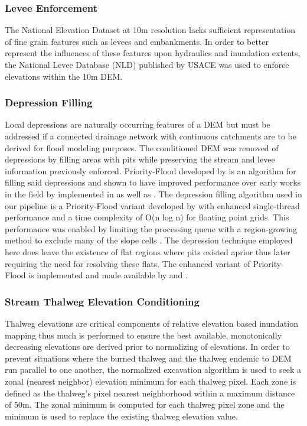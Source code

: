 \subsubsection{Levee Enforcement}
%
The National Elevation Dataset at 10m resolution lacks sufficient representation of fine grain features such as levees and embankments.
In order to better represent the influences of these features upon hydraulics and inundation extents, the National Levee Database (NLD) published by USACE was used to enforce elevations within the 10m DEM.
%
\subsubsection{Depression Filling}
\label{sssec:depression_filling}
%
Local depressions are naturally occurring features of a DEM but must be addressed if a connected drainage network with continuous catchments are to be derived for flood modeling purposes.
The conditioned DEM was removed of depressions by filling areas with pits while preserving the stream and levee information previously enforced.
Priority-Flood developed by  is an algorithm for filling said depressions and shown to have improved performance over early works in the field by  implemented in  as well as .
The depression filling algorithm used in our pipeline is a Priority-Flood variant developed by \cite{zhou2016efficient} with enhanced single-thread performance and a time complexity of O(n log n) for floating point grids.
This performance was enabled by limiting the processing queue with a region-growing method to exclude many of the slope cells \cite{zhou2016efficient}.
The depression technique employed here does leave the existence of flat regions where pits existed aprior thus later requiring the need for resolving these flats.
The enhanced variant of Priority-Flood is implemented and made available by  and .
%
\subsubsection{Stream Thalweg Elevation Conditioning}
\label{sssec:stream_thalweg_elevation_conditioning}
%
Thalweg elevations are critical components of relative elevation based inundation mapping thus much is performed to ensure the best available, monotonically decreasing elevations are derived prior to normalizing of elevations.
In order to prevent situations where the burned thalweg and the thalweg endemic to DEM run parallel to one another, the normalized excavation algorithm \cite{saunders1999preparation} is used to seek a zonal (nearest neighbor) elevation minimum for each thalweg pixel. 
Each zone is defined as the thalweg's pixel nearest neighborhood within a maximum distance of 50m.
The zonal minimum is computed for each thalweg pixel zone and the minimum is used to replace the existing thalweg elevation value.

